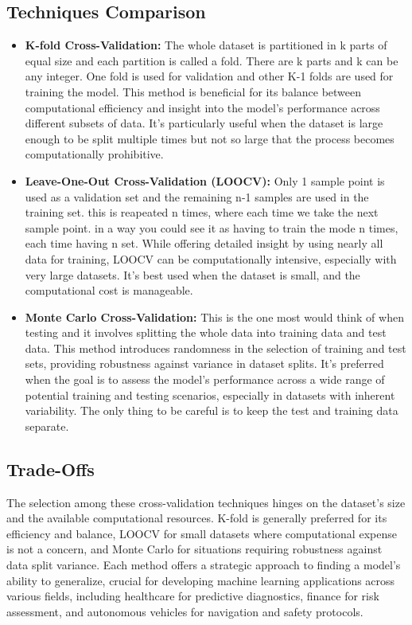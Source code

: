 \documentclass[11pt]{article}
\begin{document}
\subsection{Techniques Comparison}
\begin{itemize}
\item \textbf{K-fold Cross-Validation:} The whole dataset is partitioned in k parts of equal size and each partition is called a fold. There are k parts and k can be any integer. One fold is used for validation and other K-1 folds are used for training the model. This method is beneficial for its balance between computational efficiency and insight into the model's performance across different subsets of data. It's particularly useful when the dataset is large enough to be split multiple times but not so large that the process becomes computationally prohibitive.
\item \textbf{Leave-One-Out Cross-Validation (LOOCV):} Only 1 sample point is used as a validation set and the remaining n-1 samples are used in the training set. this is reapeated n times, where each time we take the next sample point. in a way you could see it as having to train the mode n times, each time having n set. While offering detailed insight by using nearly all data for training, LOOCV can be computationally intensive, especially with very large datasets. It's best used when the dataset is small, and the computational cost is manageable.
\item \textbf{Monte Carlo Cross-Validation:} This is the one most would think of when testing and it involves splitting the whole data into training data and test data. This method introduces randomness in the selection of training and test sets, providing robustness against variance in dataset splits. It's preferred when the goal is to assess the model's performance across a wide range of potential training and testing scenarios, especially in datasets with inherent variability. The only thing to be careful is to keep the test and training data separate.
\end{itemize}

\subsection{Trade-Offs}
The selection among these cross-validation techniques hinges on the dataset's size and the available computational resources. K-fold is generally preferred for its efficiency and balance, LOOCV for small datasets where computational expense is not a concern, and Monte Carlo for situations requiring robustness against data split variance. Each method offers a strategic approach to finding a model's ability to generalize, crucial for developing machine learning applications across various fields, including healthcare for predictive diagnostics, finance for risk assessment, and autonomous vehicles for navigation and safety protocols.
\end{document}

